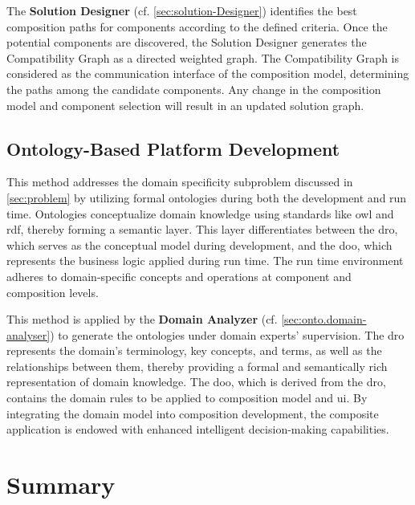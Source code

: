 The \textbf{Solution Designer} (cf. \cref{sec:solution-Designer}) identifies the best composition paths for components according to the defined criteria. Once the potential components are discovered, the Solution Designer generates the Compatibility Graph as a directed weighted graph. The Compatibility Graph is considered as the communication interface of the composition model, determining the paths among the candidate components. Any change in the composition model and component selection will result in an updated solution graph.

\vspace{-15pt}
\hypertarget{sec:obpd}{%
\subsection{Ontology-Based Platform Development}\label{sec:obpd}}
\vspace{4pt}
This method addresses the domain specificity subproblem discussed in \cref{sec:problem} by utilizing formal ontologies during both the development and run time. Ontologies conceptualize domain knowledge using standards like \gls{owl} and \gls{rdf}, thereby forming a semantic layer. This layer differentiates between the \gls{dro}, which serves as the \gls{conceptual model} during development, and the \gls{doo}, which represents the business logic applied during run time. The run time environment adheres to domain-specific concepts and operations at component and composition levels.

This method is applied by the \textbf{Domain Analyzer} (cf. \cref{sec:onto.domain-analyser}) to generate the ontologies under domain experts’ supervision. The \gls{dro} represents the domain's terminology, key concepts, and terms, as well as the relationships between them, thereby providing a formal and semantically rich representation of domain knowledge. The \gls{doo}, which is derived from the \gls{dro}, contains the domain rules to be applied to composition model and \gls{ui}. By integrating the domain model into composition development, the composite application is endowed with enhanced intelligent decision-making capabilities.

\vspace{-12pt}
\section{Summary}
\vspace{13pt}

